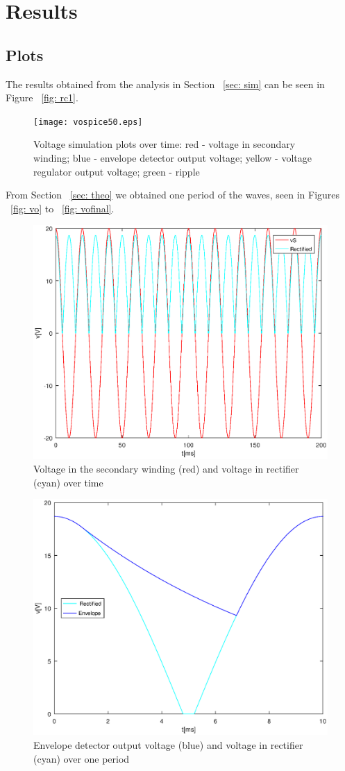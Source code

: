 \section{Results}
\label{sec: res}

\subsection{Plots}
The results obtained from the analysis in Section ~\ref{sec: sim} can be seen in Figure ~\ref{fig: rc1}.
\begin{figure}[H] \centering
\texttt{[image: vospice50.eps]}
\caption{Voltage simulation plots over time: red - voltage in secondary winding; blue - envelope detector output voltage; yellow - voltage regulator output voltage; green - ripple}
\label{fig:rc1}
\end{figure}

From Section ~\ref{sec: theo} we obtained one period of the waves, seen in Figures ~\ref{fig: vo} to ~\ref{fig: vofinal}. 

\begin{figure}[H] \centering
\includegraphics[width=0.4\linewidth]{vo.eps}
\caption{Voltage in the secondary winding (red) and voltage in rectifier (cyan) over time}
\label{fig:vo}
\end{figure}

\begin{figure}[H] \centering
\includegraphics[width=0.4\linewidth]{venvlope.eps}
\caption{Envelope detector output voltage (blue) and voltage in rectifier (cyan) over one period}
\label{fig:voen}
\end{figure}

